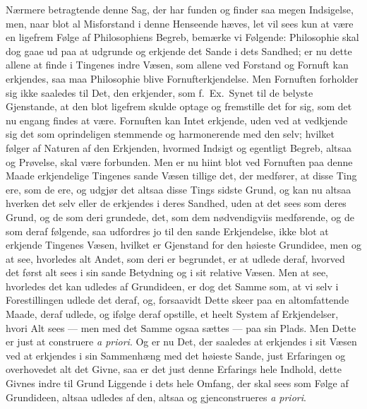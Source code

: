 \documentclass[12pt,a4paper]{book}
\begin{document}
{\small Nærmere betragtende denne Sag, der har funden og finder saa megen
Indsigelse, men, naar blot al Misforstand i denne Henseende hæves, let vil sees kun
at være en ligefrem Følge af Philosophiens Begreb, bemærke vi Følgende: Philosophie
skal dog gaae ud paa at udgrunde og erkjende det Sande i dets Sandhed; er nu dette
allene at finde i Tingenes indre Væsen, som allene ved Forstand og Fornuft kan
erkjendes, saa maa Philosophie blive Fornufterkjendelse. Men Fornuften forholder sig
ikke saaledes til Det, den erkjender, som f.\ Ex.\ Synet til de belyste Gjenstande,
at den blot ligefrem skulde optage og fremstille det for sig, som det nu engang
findes at være. Fornuften kan Intet erkjende, uden ved at vedkjende sig det som
oprindeligen stemmende og harmonerende med den selv; hvilket følger af Naturen af
den Erkjenden, hvormed Indsigt og egentligt Begreb, altsaa og Prøvelse, skal være
forbunden. Men er nu hiint blot ved Fornuften paa denne Maade erkjendelige Tingenes
sande Væsen tillige det, der medfører, at disse Ting ere, som de ere, og udgjør det
altsaa disse Tings sidste Grund, og kan nu altsaa hverken det selv eller de
erkjendes i deres Sandhed, uden at det sees som deres Grund, og de som deri
grundede, det, som dem nødvendigviis medførende, og de som deraf følgende, saa
udfordres jo til den sande Erkjendelse, ikke blot at erkjende Tingenes Væsen,
hvilket er Gjenstand for den høieste Grundidee, men og at see, hvorledes alt Andet,
som deri er begrundet, er at udlede deraf, hvorved det først alt sees i sin sande
Betydning og i sit relative Væsen. Men at see, hvorledes det kan udledes af
Grundideen, er dog det Samme som, at vi selv i Forestillingen udlede det deraf, og,
forsaavidt Dette skeer paa en altomfattende Maade, deraf udlede, og ifølge deraf
opstille, et heelt System af Erkjendelser, hvori Alt sees --- men med det Samme ogsaa
sættes --- paa sin Plads. Men Dette er just at construere \textit{a priori}. Og er nu
Det, der saaledes at erkjendes i sit Væsen ved at erkjendes i sin Sammenhæng med det
høieste Sande, just Erfaringen og overhovedet alt det Givne, saa er det just denne
Erfarings hele Indhold, dette Givnes indre til Grund Liggende i dets hele Omfang,
der skal sees som Følge af Grundideen, altsaa udledes af den, altsaa og
gjenconstrueres \textit{a priori}.\par}
\end{document}
